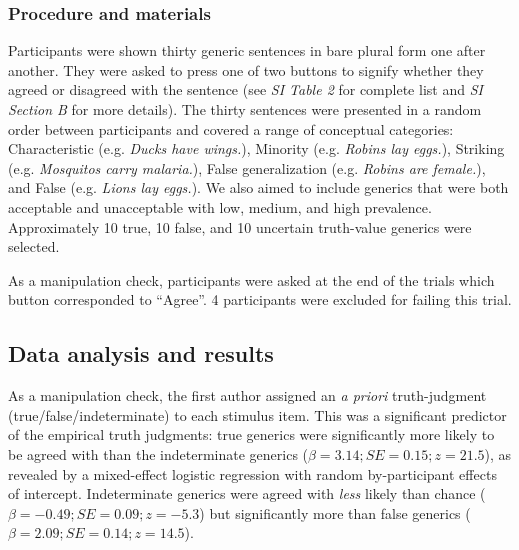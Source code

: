 \documentclass[12pt,letterpaper]{article}
\newcommand{\ndg}[1]{\textcolor{Green}{[ndg: #1]}}
\begin{document}
\subsubsection*{Procedure and materials}

Participants were shown thirty generic sentences in bare plural form one after another. 
They were asked to press one of two buttons to signify whether they agreed or disagreed with the sentence (see {\it SI Table 2} for complete list and {\it SI Section B} for more details). 
The thirty sentences were presented in a random order between participants and covered a range of conceptual categories: Characteristic (e.g. \emph{Ducks have wings.}), Minority (e.g. \emph{Robins lay eggs.}), Striking (e.g. \emph{Mosquitos carry malaria.}), False generalization (e.g. \emph{Robins are female.}), and False (e.g. \emph{Lions lay eggs.}).
We also aimed to include generics that were both acceptable and unacceptable with low, medium, and high prevalence.
Approximately 10 true, 10 false, and 10 uncertain truth-value generics were selected.


As a manipulation check, participants were asked at the end of the trials which button corresponded to ``Agree''. 4 participants were excluded for failing this trial.


\subsection*{Data analysis and results}
 
 As a manipulation check, the first author assigned an \emph{a priori} truth-judgment (true/false/indeterminate) to each stimulus item.
This was a significant predictor of the empirical truth judgments: true generics were significantly more likely to be agreed with than the indeterminate generics ($\beta = 3.14; SE = 0.15; z = 21.5$), as revealed by a mixed-effect logistic regression with random by-participant effects of intercept.
Indeterminate generics were agreed with \emph{less} likely than chance ($\beta = -0.49; SE = 0.09; z = -5.3$) but significantly more than false generics ($\beta = 2.09; SE = 0.14; z = 14.5$).

 
 
\end{document}
